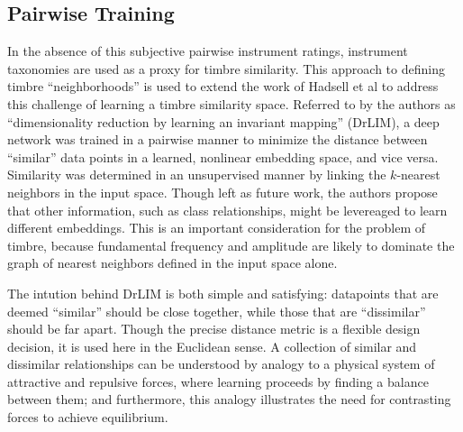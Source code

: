 \subsection{Pairwise Training}
\label{subsec:timbre_pairwise}

In the absence of this subjective pairwise instrument ratings, instrument taxonomies are used as a proxy for timbre similarity.
This approach to defining timbre ``neighborhoods'' is used to extend the work of Hadsell et al \cite{Hadsell2007} to address this challenge of learning a timbre similarity space.
Referred to by the authors as ``dimensionality reduction by learning an invariant mapping'' (DrLIM), a deep network was trained in a pairwise manner to minimize the distance between ``similar'' data points in a learned, nonlinear embedding space, and vice versa.
Similarity was determined in an unsupervised manner by linking the $k$-nearest neighbors in the input space.
Though left as future work, the authors propose that other information, such as class relationships, might be levereaged to learn different embeddings.
This is an important consideration for the problem of timbre, because fundamental frequency and amplitude are likely to dominate the graph of nearest neighbors defined in the input space alone.

The intution behind DrLIM is both simple and satisfying: datapoints that are deemed ``similar'' should be close together, while those that are ``dissimilar'' should be far apart.
Though the precise distance metric is a flexible design decision, it is used here in the Euclidean sense.
A collection of similar and dissimilar relationships can be understood by analogy to a physical system of attractive and repulsive forces, where learning proceeds by finding a balance between them; and furthermore, this analogy illustrates the need for contrasting forces to achieve equilibrium.

